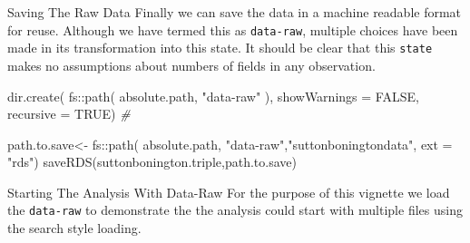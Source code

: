 \documentclass[
  ignorenonframetext,
]{beamer}
\newenvironment{Shaded}{\begin{snugshade}}{\end{snugshade}}
\newcommand{\AttributeTok}[1]{\textcolor[rgb]{0.77,0.63,0.00}{#1}}
\newcommand{\CommentTok}[1]{\textcolor[rgb]{0.56,0.35,0.01}{\textit{#1}}}
\newcommand{\ConstantTok}[1]{\textcolor[rgb]{0.00,0.00,0.00}{#1}}
\newcommand{\FunctionTok}[1]{\textcolor[rgb]{0.00,0.00,0.00}{#1}}
\newcommand{\NormalTok}[1]{#1}
\newcommand{\OtherTok}[1]{\textcolor[rgb]{0.56,0.35,0.01}{#1}}
\newcommand{\SpecialCharTok}[1]{\textcolor[rgb]{0.00,0.00,0.00}{#1}}
\newcommand{\StringTok}[1]{\textcolor[rgb]{0.31,0.60,0.02}{#1}}
\begin{document}
\begin{frame}[fragile]{Saving The Raw Data}
\protect\hypertarget{saving-the-raw-data}{}
Finally we can save the data in a machine readable format for reuse.
Although we have termed this as \texttt{data-raw}, multiple choices have
been made in its transformation into this state. It should be clear that
this \texttt{state} makes no assumptions about numbers of fields in any
observation.

\begin{Shaded}
\begin{Highlighting}[]
\FunctionTok{dir.create}\NormalTok{( }
\NormalTok{          fs}\SpecialCharTok{::}\FunctionTok{path}\NormalTok{( absolute.path,}
            \StringTok{"data{-}raw"}\NormalTok{ ),  }
            \AttributeTok{showWarnings =} \ConstantTok{FALSE}\NormalTok{,}
            \AttributeTok{recursive =} \ConstantTok{TRUE}\NormalTok{) }\CommentTok{\# }

\NormalTok{path.to.save}\OtherTok{\textless{}{-}}\NormalTok{ fs}\SpecialCharTok{::}\FunctionTok{path}\NormalTok{( absolute.path,}
 \StringTok{"data{-}raw"}\NormalTok{,}\StringTok{"suttonboningtondata"}\NormalTok{, }\AttributeTok{ext =} \StringTok{"rds"}\NormalTok{)}
\FunctionTok{saveRDS}\NormalTok{(suttonbonington.triple,path.to.save)}
\end{Highlighting}
\end{Shaded}
\end{frame}

\begin{frame}[fragile]{Starting The Analysis With Data-Raw}
\protect\hypertarget{starting-the-analysis-with-data-raw}{}
For the purpose of this vignette we load the \texttt{data-raw} to
demonstrate the the analysis could start with multiple files using the
search style loading.

\begin{Shaded}
\end{Shaded}
\end{frame}
\end{document}
